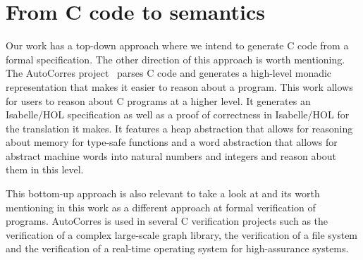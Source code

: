 \section{From C code to semantics}

Our work has a top-down approach where we intend to generate C code from a formal specification.
The other direction of this approach is worth mentioning.
The AutoCorres project~\parencite{autocorres} parses C code and generates a high-level monadic representation that makes it easier to reason about a program.
This work allows for users to reason about C programs at a higher level.
It generates an Isabelle/HOL specification as well as a proof of correctness in Isabelle/HOL for the translation it makes.
It features a heap abstraction that allows for reasoning about memory for type-safe functions and a word abstraction that allows for abstract machine words into natural numbers and integers and reason about them in this level.

This bottom-up approach is also relevant to take a look at and its worth mentioning in this work as a different approach at formal verification of programs.
AutoCorres is used in several C verification projects such as the verification of a complex large-scale graph library, the verification of a file system and the verification of a real-time operating system for high-assurance systems.
